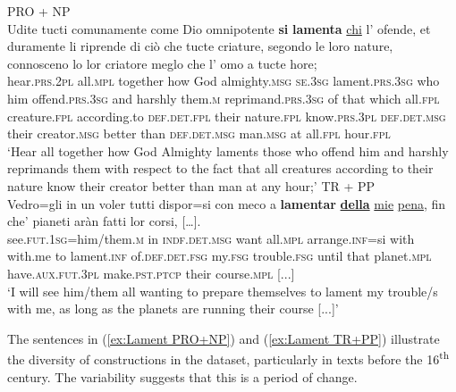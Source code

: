 \documentclass[output=paper,colorlinks,citecolor=brown]{langscibook}
\begin{document}
\begin{exe}
\ex \label{Lamentarsi Set2} \begin{xlist}
    \ex PRO + NP \\ \label{ex:Lament PRO+NP}
    \gll Udite tucti comunamente come Dio omnipotente \textbf{si} \textbf{lamenta} \ul{chi} l' ofende, et duramente li riprende di ciò che tucte criature, segondo le loro nature, connosceno lo lor criatore meglo che l' omo a tucte hore;\\
    hear.\textsc{prs.2pl} all.\textsc{mpl} together how God almighty.\textsc{msg} \textsc{se}.\textsc{3sg} lament.\textsc{prs.3sg} who him offend.\textsc{prs.3sg} and harshly them.\textsc{m} reprimand.\textsc{prs.3sg} of that which all.\textsc{fpl} creature.\textsc{fpl} according.to \textsc{def.det.fpl} their nature.\textsc{fpl} know.\textsc{prs.3pl} \textsc{def.det.msg} their creator.\textsc{msg} better than \textsc{def.det.msg} man.\textsc{msg} at all.\textsc{fpl} hour.\textsc{fpl} \\ 
    \glt ‘Hear all together how God Almighty laments those who offend him and harshly reprimands them with respect to the fact that all creatures according to their nature know their creator better than man at any hour;’
    \newpage
    \ex TR + PP\\ \label{ex:Lament TR+PP}
    \gll Vedro=gli in un voler tutti dispor=si con meco a \textbf{lamentar} \ul{\textbf{della}} {\ul{mie}\footnotemark} \ul{pena}, fin che’ pianeti aràn fatti lor corsi, […].\\
    see.\textsc{fut.1sg}=him/them.\textsc{m} in \textsc{indf.det.msg} want all.\textsc{mpl} arrange.\textsc{inf}=si with with.me to lament.\textsc{inf} of.\textsc{def.det.fsg} my.\textsc{fsg} trouble.\textsc{fsg} until that planet.\textsc{mpl} have.\textsc{aux.fut.3pl} make.\textsc{pst.ptcp} their course.\textsc{mpl} [...]\\ 
    \glt ‘I will see him/them all wanting to prepare themselves to lament my trouble/s with me, as long as the planets are running their course [...]’
\end{xlist}
\end{exe}
\footnotetext{[sic]}

The sentences in (\ref{ex:Lament PRO+NP}) and (\ref{ex:Lament TR+PP}) illustrate the diversity of constructions in the dataset, particularly in texts before the 16\textsuperscript{th} century. The variability suggests that this is a period of change.
\end{document}

